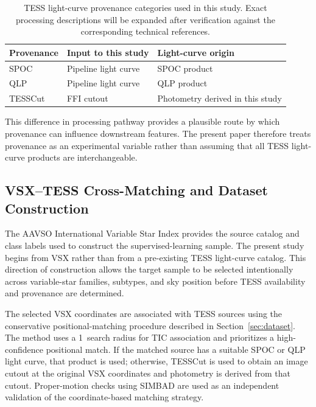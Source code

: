 \documentclass[linenumbers]{aastex701}
\begin{document}
\begin{table}[ht]
\centering
\caption{TESS light-curve provenance categories used in this study. Exact processing descriptions will be expanded after verification against the corresponding technical references.}
\label{tab:provenance_overview}
\begin{tabular}{lll}
\hline\hline
Provenance & Input to this study & Light-curve origin \\
\hline
SPOC & Pipeline light curve & SPOC product \\
QLP & Pipeline light curve & QLP product \\
TESSCut & FFI cutout & Photometry derived in this study \\
\hline
\end{tabular}
\end{table}

This difference in processing pathway provides a plausible route by which provenance can influence downstream features. The present paper therefore treats provenance as an experimental variable rather than assuming that all TESS light-curve products are interchangeable.


\subsection{VSX--TESS Cross-Matching and Dataset Construction}
The AAVSO International Variable Star Index provides the source catalog and class labels used to construct the supervised-learning sample. The present study begins from VSX rather than from a pre-existing TESS light-curve catalog. This direction of construction allows the target sample to be selected intentionally across variable-star families, subtypes, and sky position before TESS availability and provenance are determined.

The selected VSX coordinates are associated with TESS sources using the conservative positional-matching procedure described in Section~\ref{sec:dataset}. The method uses a 1\arcsec\ search radius for TIC association and prioritizes a high-confidence positional match. If the matched source has a suitable SPOC or QLP light curve, that product is used; otherwise, TESSCut is used to obtain an image cutout at the original VSX coordinates and photometry is derived from that cutout. Proper-motion checks using SIMBAD are used as an independent validation of the coordinate-based matching strategy.
\end{document}
